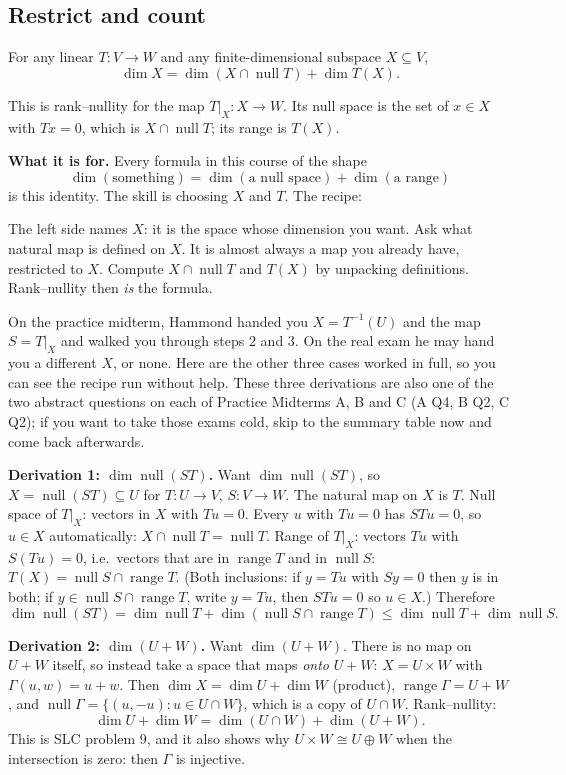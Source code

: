 \documentclass[11pt]{scrartcl}
\DeclareMathOperator{\nul}{null}
\DeclareMathOperator{\range}{range}
\begin{document}
\subsection{Restrict and count}
\begin{theorem*}[T3]
  For any linear $T\colon V\to W$ and any finite-dimensional subspace $X\subseteq V$,
  \[ \dim X=\dim(X\cap\nul T)+\dim T(X). \]
\end{theorem*}
\why This is rank--nullity for the map $T|_X\colon X\to W$. Its null space is the set of $x\in X$ with $Tx=0$, which is $X\cap\nul T$; its range is $T(X)$.

\medskip\noindent\textbf{What it is for.} Every formula in this course of the shape
\[ \dim(\text{something})=\dim(\text{a null space})+\dim(\text{a range}) \]
is this identity. The skill is choosing $X$ and $T$. The recipe:
\begin{enumerate}
  \ii The left side names $X$: it is the space whose dimension you want.
  \ii Ask what natural map is defined on $X$. It is almost always a map you already have, restricted to $X$.
  \ii Compute $X\cap\nul T$ and $T(X)$ by unpacking definitions. Rank--nullity then \emph{is} the formula.
\end{enumerate}
On the practice midterm, Hammond handed you $X=T^{-1}(U)$ and the map $S=T|_X$ and walked you through steps 2 and 3. On the real exam he may hand you a different $X$, or none. Here are the other three cases worked in full, so you can see the recipe run without help. These three derivations are also one of the two abstract questions on each of Practice Midterms A, B and C (A Q4, B Q2, C Q2); if you want to take those exams cold, skip to the summary table now and come back afterwards.

\medskip\noindent\textbf{Derivation 1: $\dim\nul(ST)$.} Want $\dim\nul(ST)$, so $X=\nul(ST)\subseteq U$ for $T\colon U\to V$, $S\colon V\to W$. The natural map on $X$ is $T$.
Null space of $T|_X$: vectors in $X$ with $Tu=0$. Every $u$ with $Tu=0$ has $STu=0$, so $u\in X$ automatically: $X\cap\nul T=\nul T$.
Range of $T|_X$: vectors $Tu$ with $S(Tu)=0$, i.e.\ vectors that are in $\range T$ and in $\nul S$: $T(X)=\nul S\cap\range T$. (Both inclusions: if $y=Tu$ with $Sy=0$ then $y$ is in both; if $y\in\nul S\cap\range T$, write $y=Tu$, then $STu=0$ so $u\in X$.)
Therefore
\[ \dim\nul(ST)=\dim\nul T+\dim(\nul S\cap\range T)\le\dim\nul T+\dim\nul S. \]

\medskip\noindent\textbf{Derivation 2: $\dim(U+W)$.} Want $\dim(U+W)$. There is no map on $U+W$ itself, so instead take a space that maps \emph{onto} $U+W$: $X=U\times W$ with $\Gamma(u,w)=u+w$. Then $\dim X=\dim U+\dim W$ (product), $\range\Gamma=U+W$, and $\nul\Gamma=\{(u,-u):u\in U\cap W\}$, which is a copy of $U\cap W$. Rank--nullity:
\[ \dim U+\dim W=\dim(U\cap W)+\dim(U+W). \]
This is SLC problem 9, and it also shows why $U\times W\cong U\oplus W$ when the intersection is zero: then $\Gamma$ is injective.
\end{document}
